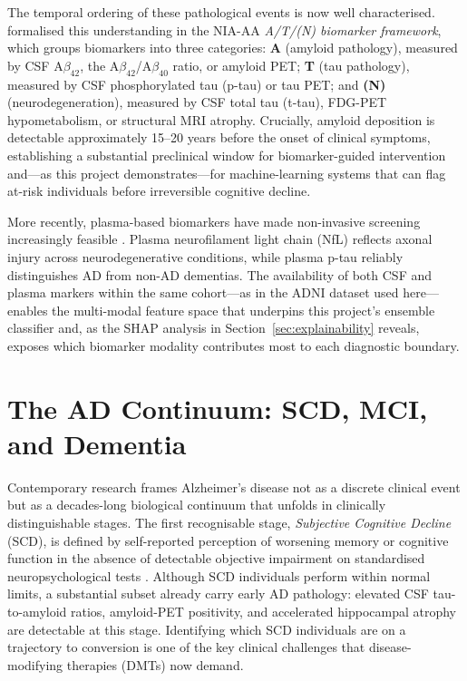 The temporal ordering of these pathological events is now well characterised.
\citet{jack2018nia} formalised this understanding in the NIA-AA
\emph{A/T/(N) biomarker framework}, which groups biomarkers into three
categories: \textbf{A} (amyloid pathology), measured by CSF
A$\beta_{42}$, the A$\beta_{42}$/A$\beta_{40}$ ratio, or amyloid PET;
\textbf{T} (tau pathology), measured by CSF phosphorylated tau (p-tau) or tau
PET; and \textbf{(N)} (neurodegeneration), measured by CSF total tau (t-tau),
FDG-PET hypometabolism, or structural MRI atrophy. Crucially, amyloid
deposition is detectable approximately 15--20 years before the onset of
clinical symptoms, establishing a substantial preclinical window for
biomarker-guided intervention and---as this project demonstrates---for
machine-learning systems that can flag at-risk individuals before irreversible
cognitive decline.

More recently, plasma-based biomarkers have made non-invasive screening
increasingly feasible \citep{zetterberg2021plasma}. Plasma neurofilament light
chain (NfL) reflects axonal injury across neurodegenerative conditions, while
plasma p-tau reliably distinguishes AD from non-AD dementias. The availability
of both CSF and plasma markers within the same cohort---as in the ADNI dataset
used here---enables the multi-modal feature space that underpins this project's
ensemble classifier and, as the SHAP analysis in
Section~\ref{sec:explainability} reveals, exposes which biomarker modality
contributes most to each diagnostic boundary.

\section{The AD Continuum: SCD, MCI, and Dementia}
\label{sec:ad-continuum}

Contemporary research frames Alzheimer's disease not as a discrete clinical
event but as a decades-long biological continuum that unfolds in clinically
distinguishable stages. The first recognisable stage, \emph{Subjective
Cognitive Decline} (SCD), is defined by self-reported perception of worsening
memory or cognitive function in the absence of detectable objective impairment
on standardised neuropsychological tests \citep{jessen2014scd}. Although SCD
individuals perform within normal limits, a substantial subset already carry
early AD pathology: elevated CSF tau-to-amyloid ratios, amyloid-PET positivity,
and accelerated hippocampal atrophy are detectable at this stage. Identifying
which SCD individuals are on a trajectory to conversion is one of the key
clinical challenges that disease-modifying therapies (DMTs) now demand.

